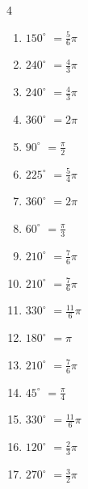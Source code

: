\begin{multicols}{4}
\begin{enumerate}
  \item $\displaystyle 150^{\circ}$
        $\displaystyle =\frac{5}{6}\pi$

  \item $\displaystyle 240^{\circ}$
        $\displaystyle =\frac{4}{3}\pi$

  \item $\displaystyle 240^{\circ}$
        $\displaystyle =\frac{4}{3}\pi$

  \item $\displaystyle 360^{\circ}$
        $\displaystyle =2\pi$

  \item $\displaystyle 90^{\circ}$
        $\displaystyle =\frac{\pi}{2}$

  \item $\displaystyle 225^{\circ}$
        $\displaystyle =\frac{5}{4}\pi$

  \item $\displaystyle 360^{\circ}$
        $\displaystyle =2\pi$

  \item $\displaystyle 60^{\circ}$
        $\displaystyle =\frac{\pi}{3}$

  \item $\displaystyle 210^{\circ}$
        $\displaystyle =\frac{7}{6}\pi$

  \item $\displaystyle 210^{\circ}$
        $\displaystyle =\frac{7}{6}\pi$

  \item $\displaystyle 330^{\circ}$
        $\displaystyle =\frac{11}{6}\pi$

  \item $\displaystyle 180^{\circ}$
        $\displaystyle =\pi$

  \item $\displaystyle 210^{\circ}$
        $\displaystyle =\frac{7}{6}\pi$

\columnbreak %

  \item $\displaystyle 45^{\circ}$
        $\displaystyle =\frac{\pi}{4}$

  \item $\displaystyle 330^{\circ}$
        $\displaystyle =\frac{11}{6}\pi$

  \item $\displaystyle 120^{\circ}$
        $\displaystyle =\frac{2}{3}\pi$

  \item $\displaystyle 270^{\circ}$
        $\displaystyle =\frac{3}{2}\pi$


\end{enumerate}
\end{multicols}
